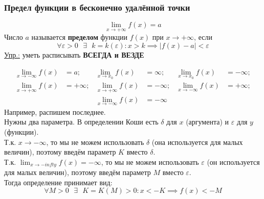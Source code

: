 \documentclass[12pt]{article}
\begin{document}
    \subsubsection*{Предел функции в бесконечно удалённой точки}
    \[\lim_{x\to +\infty}f(x) = a\]
    Число $a$ называется \textbf{пределом} функции $f(x)$ при $x \to +\infty$, если 
    \[ \forall \varepsilon > 0 \text{ } \exists \text{ } k = k(\varepsilon) : x > k \implies |f(x) - a| < \varepsilon \]
    \underline{Упр.:} уметь расписывать \textbf{ВСЕГДА и ВЕЗДЕ}
    \begin{adjustwidth}{1.5em}{1.5em}
        \begin{align*}
            \lim_{x\to -\infty}f(x) &= a; &
            \lim_{x\to x_0}f(x) &= \infty; &
            \lim_{x\to x_0}f(x) &= -\infty;\\
            \lim_{x\to +\infty}f(x) &= +\infty; &
            \lim_{x\to +\infty}f(x) &= -\infty; &
            \lim_{x\to -\infty}f(x) &= +\infty;\\
            & & \lim_{x\to -\infty}f(x) &= -\infty
        \end{align*}
        Например, распишем последнее.\\
        Нужны два параметра. В определении Коши есть $\delta$ для $x$ (аргумента) и $\varepsilon$ для $y$ (функции).\\
        Т.к. $x \to -\infty$, то мы не можем использовать $\delta$ (она используется для малых величин), поэтому введём параметр $K$ вместо $\delta$.\\
        Т.к. $\lim_{x\to -infty}f(x) = -\infty$, то мы не можем использовать $\varepsilon$ (он используется для малых величин), поэтому введём параметр $M$ вместо $\varepsilon$.\\
        Тогда определение принимает вид:
        \[
            \forall M > 0 \text{ } \exists \text{ } K = K(M) > 0 : x < -K \implies f(x) < -M
        \]
    \end{adjustwidth}
\end{document}
